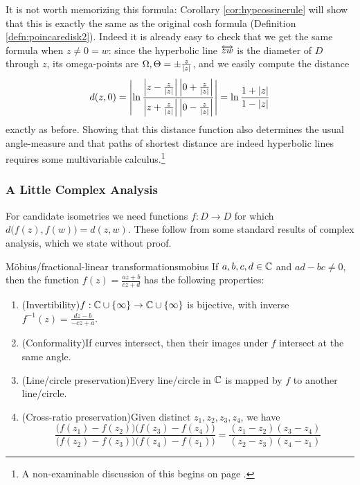 It is not worth memorizing this formula: Corollary \ref{cor:hypcossinerule} will show that this is exactly the same as the original cosh formula (Definition \ref{defn:poincaredisk2}). Indeed it is already easy to check that we get the same formula when $z\neq 0=w$: since the hyperbolic line $\overleftrightarrow{zw}$ is the diameter of $D$ through $z$, its omega-points are $\Omega,\Theta=\pm\frac z{\left| z\right|}$, and we easily compute the distance
\[
	d(z,0)=\left| \ln\frac{\left| z-\frac z{\left| z\right|}\right|\left| 0+\frac z{\left| z\right|}\right|}{\left| z+\frac z{\left| z\right|}\right|\left| 0-\frac z{\left| z\right|}\right|}\right|
	=\ln\frac{1+\left| z\right|}{1-\left| z\right|}
\]
exactly as before. Showing that this distance function also determines the usual angle-measure and that paths of shortest distance are indeed hyperbolic lines requires some multivariable calculus.\footnote{%
	A non-examinable discussion of this begins on page \pageref{pg:hyp1stform}.
}

\subsubsection*{A Little Complex Analysis}

For candidate isometries we need functions $f:D\to D$ for which $d\bigl(f(z),f(w)\bigr)=d(z,w)$. These follow from some standard results of complex analysis, which we state without proof.


\begin{thm}{Möbius/fractional-linear transformations}{mobius}
	If $a,b,c,d\in\mathbb{C}$ and $ad-bc\neq 0$, then the function $f(z)=\tfrac{az+b}{cz+d}$ has the following properties:
	\begin{enumerate}
	  \item (Invertibility)\lstsp $f:\mathbb{C}\cup\{\infty\}\to \mathbb{C}\cup\{\infty\}$ is bijective, with inverse $f^{-1}(z)=\tfrac{dz-b}{-cz+a}$.
	  \item (Conformality)\lstsp If curves intersect, then their images under $f$ intersect at the same angle.
	  \item (Line/circle preservation)\lstsp Every line/circle\footnotemark{} in $\mathbb{C}$ is mapped by $f$ to another line/circle.
	  \item(Cross-ratio preservation)\lstsp Given distinct $z_1,z_2,z_3,z_4$, we have
		\[
			\frac{\big(f(z_1)-f(z_2)\big)\big(f(z_3)-f(z_4)\big)}{\big(f(z_2)-f(z_3)\big)\big(f(z_4)-f(z_1)\big)} =\frac{(z_1-z_2)(z_3-z_4)}{(z_2-z_3)(z_4-z_1)}
		\]\vspace{-5pt}
	\end{enumerate}
\end{thm}


